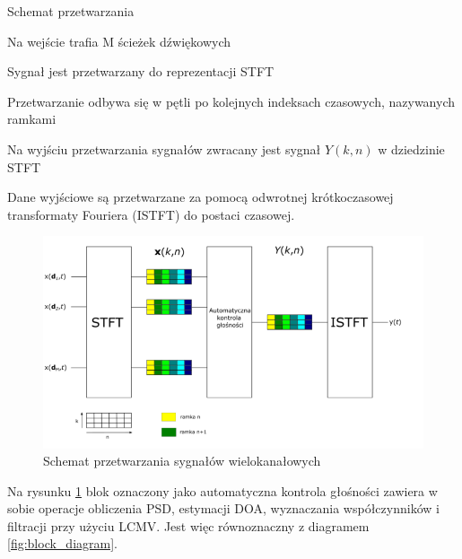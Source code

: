 \begin{algorithm}
  
  \caption{Schemat przetwarzania}
  \begin{algorithmic}[1]
    \State Na wejście trafia M ścieżek dźwiękowych
    
    \State Sygnał jest przetwarzany do reprezentacji STFT
    
    \State Przetwarzanie odbywa się w pętli po kolejnych indeksach czasowych, nazywanych ramkami
    
    \State Na wyjściu przetwarzania sygnałów zwracany jest sygnał $Y(k,n)$ w dziedzinie STFT
    
    \State Dane wyjściowe są przetwarzane za pomocą odwrotnej krótkoczasowej transformaty Fouriera (ISTFT) do postaci czasowej.
    
  \end{algorithmic}
\end{algorithm}

\begin{figure}[h!]
    \centering
    \includegraphics[width=\textwidth]{Images/processing.png}
    \caption{Schemat przetwarzania sygnałów wielokanałowych}
    \label{fig:processing}
\end{figure}

\noindent Na rysunku \ref{fig:processing} blok oznaczony jako automatyczna kontrola głośności zawiera w sobie operacje obliczenia PSD, estymacji DOA, wyznaczania współczynników i filtracji przy użyciu LCMV. Jest więc równoznaczny z diagramem \ref{fig:block_diagram}.


